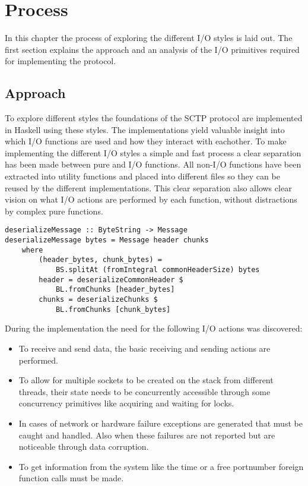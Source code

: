 \chapter{Process}
In this chapter the process of exploring the different I/O styles is laid out. The first section explains the approach and an analysis of the I/O primitives required for implementing the protocol.

\section{Approach}
To explore different styles the foundations of the SCTP protocol\cite{_rfc_????} are implemented in Haskell using these styles. The implementations yield valuable insight into which I/O functions are used and how they interact with eachother.
To make implementing the different I/O styles a simple and fast process a clear separation has been made between pure and I/O functions. All non-I/O functions have been extracted into utility functions and placed into different files so they can be reused by the different implementations. This clear separation also allows clear vision on what I/O actions are performed by each function, without distractions by complex pure functions.

\begin{lstlisting}[caption={An example of a shared pure function}]
deserializeMessage :: ByteString -> Message
deserializeMessage bytes = Message header chunks
    where
        (header_bytes, chunk_bytes) =
            BS.splitAt (fromIntegral commonHeaderSize) bytes
        header = deserializeCommonHeader $
            BL.fromChunks [header_bytes]
        chunks = deserializeChunks $
            BL.fromChunks [chunk_bytes]
\end{lstlisting}

During the implementation the need for the following I/O actions was discovered:

\begin{itemize}

\item To receive and send data, the basic receiving and sending actions are performed.

\item To allow for multiple sockets to be created on the stack from different threads, their state needs to be concurrently accessible through some concurrency primitives like acquiring and waiting for locks.

\item In cases of network or hardware failure exceptions are generated that must be caught and handled. Also when these failures are not reported but are noticeable through data corruption.

\item To get information from the system like the time or a free portnumber foreign function calls must be made.
\end{itemize}

